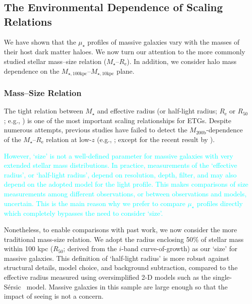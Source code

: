 \documentclass[a4paper,fleqn,usenatbib]{mnras}
\def\ser{{S\'{e}rsic\ }}
\def\mstar{{$M_{\star}$}}
\def\mhalo{{$M_{\mathrm{200b}}$}}
\def\minn{{$M_{\star,10\mathrm{kpc}}$}}
\def\mtot{{$M_{\star,100\mathrm{kpc}}$}}
\def\mden{{$\mu_{\star}$}}
\newcommand{\song}[1]{\textcolor{cyan}{#1}}
\begin{document}

\subsection{The Environmental Dependence of Scaling Relations}
    \label{ssec:scaling}
    
    We have shown that the \mden{} profiles of massive galaxies vary with the masses of their host dark matter haloes. We now turn our attention to the more commonly studied stellar 
    mass--size relation (\mstar{}--$R_{\mathrm{e}}$). 
    In addition, we consider halo mass dependence on the 
    \mtot{}--\minn{} plane. 
    
\subsubsection{Mass--Size Relation}
    \label{sssec:mass_size}
    
    The tight relation between \mstar{} and effective radius (or half-light radius; 
    $R_{\mathrm{e}}$ or $R_{\mathrm{50}}$; e.g., \citealt{Shankar2013, Leja2013, 
    vdWel2014}) is one of the most important scaling relationships for ETGs. 
    Despite numerous attempts, previous studies have failed to detect the 
    \mhalo{}-dependence of the \mstar{}--$R_{\mathrm{e}}$ relation at low-$z$ 
    (e.g., \citealt{Weinmann2009, Nair2010, HCompany13, Cerbrian2014}; 
    except for the recent result by \citealt{Yoon2017}). 
    
    \song{However, `size' is not a well-defined parameter for massive 
    galaxies with very extended stellar mass distributions. 
    In practice, measurements of the `effective radius', or `half-light radius', depend on resolution, depth, filter, and may also 
    depend on the adopted model for the light profile.  
    This makes comparisons of size measurements among different observations, 
    or between observations and models, uncertain. This is the main reason
    why we prefer to compare \mden{} profiles directly which completely bypasses the need to consider `size'.
    }
    
    Nonetheless, to enable comparisons with past work, we now consider the more traditional mass-size relation. We adopt the radius enclosing 50\% of stellar mass within 
    100 kpc ($R_{\mathrm{50}}$; derived from the $i$-band curve-of-growth) as our 
    `size' for massive galaxies. This definition of `half-light radius' is more robust against structural 
    details, model choice, and background subtraction, compared to the 
    effective radius measured using oversimplified 2-D models such as the single-\ser{} model. 
    Massive galaxies in this sample are large enough so that the impact of seeing 
    is not a concern.
    
\end{document}
